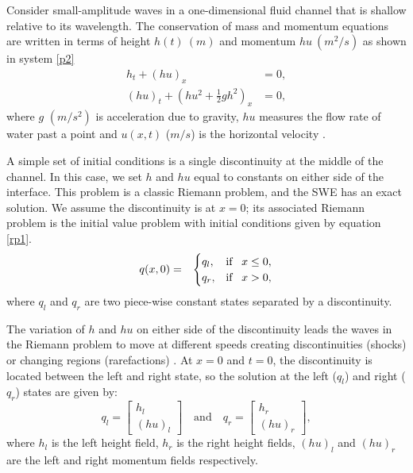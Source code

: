 \documentclass[9pt,a4paper]{article}
\begin{document}
	Consider small-amplitude waves in a one-dimensional fluid channel that is shallow relative to its wavelength. The conservation of mass and  momentum equations are written in terms of  height $h(t)~(m)$ and momentum $hu~(m^{2}/s)$ as shown in system \eqref{p2}
	\begin{equation}
		\begin{aligned}
			h_{t} + (hu)_x &= 0, \\
			(hu)_t + \left(hu^{2} + \frac{1}{2} gh^{2} \right)_x & = 0,
		\end{aligned}
		\label{p2}
	\end{equation}	
	where $g$ $(m/s^{2})$ is acceleration due to gravity, $hu$ measures the flow rate of water past a point and $u(x,t)$ ($m/s$) is the horizontal velocity  \citep{leveque2002finite,toro2001shock}.  
	
	A simple set of initial conditions is a single discontinuity at the middle of the channel.  In this case, we set $h$ and $hu$ equal to constants on either side of the interface.  This problem is a classic Riemann problem, and the SWE has an exact solution.  We assume the discontinuity is at $x = 0$; its associated Riemann problem is the initial value problem with initial conditions given by equation \eqref{rp1}.
	\begin{eqnarray}
		q(x,0)& =& \begin{cases}
			q_{l}, & \text{if \, $x \le 0,$}\\
			q_{r},& \text{if \, $x > 0,$}\\
			
		\end{cases}  
		\label{rp1}     
	\end{eqnarray}
	where $q_{l}$ and $q_{r}$ are two piece-wise constant states separated by a discontinuity. 
	
	The variation of $h$ and $hu$ on either side of the discontinuity leads the waves in the Riemann problem to move at different speeds creating discontinuities (shocks) or changing regions (rarefactions) \citep{leveque2002finite}.  At $x = 0$ and $t = 0$,   the discontinuity is located between the left and right state, so the solution at the left ($q_{l}$) and right ($q_{r}$) states are given by: 
	\begin{equation}
		q_{l} = \begin{bmatrix}
			h_{l} \\(hu)_{l}
		\end{bmatrix}  \quad \text{and} \quad q_{r} = \begin{bmatrix}
			h_{r} \\(hu)_{r}
		\end{bmatrix},
		\label{ic}
	\end{equation}
	where $h_l$ is the left height field,  $h_r$ is the right height fields, $(hu)_l$ and $(hu)_r$ are the left and right momentum fields respectively.
	
\end{document}
